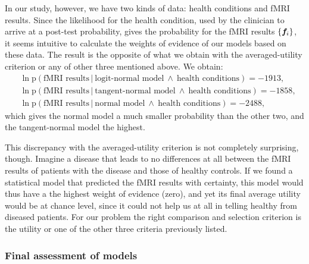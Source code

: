 \documentclass[%
]{frontiersSCNS-nologo} %
\newcommand*{\pf}{\mathrm{p}}%
\renewcommand*{\|}{\mathpunct{|}}%
\newcommand*{\Land}{\mathbin{\ \land\ }}
\newcommand*{\Cond}{\mathpunct{\,|\ }}%
\DeclarePairedDelimiter\set{\{}{\}}%
\newcommand*{\yxx}{f}
\newcommand*{\yx}{\bm{\yxx}}
\begin{document}
In our study, however, we have two kinds of data: health conditions and
fMRI results. Since the likelihood for the health condition, used by the
clinician to arrive at a post-test probability, gives the probability for
the fMRI results $\set{\yx_i}$, it seems intuitive to calculate the weights
of evidence of our models based on these data. The result is the opposite
of what we obtain with the averaged-utility criterion or any of other three
mentioned above. We obtain:
\begin{equation}
  \label{eq:weights_evidence}
  \begin{aligned}
    &\ln\pf(\text{fMRI results} \Cond \text{logit-normal model} \Land \text{health conditions}) = -1913,\\
    &\ln\pf(\text{fMRI results} \Cond \text{tangent-normal model} \Land \text{health conditions}) = -1858,\\
    &\ln\pf(\text{fMRI results} \Cond \text{normal model} \Land \text{health conditions}) = -2488,
  \end{aligned}
\end{equation}
which gives the normal model a much smaller probability than the other two,
and the tangent-normal model the highest.


This discrepancy with the averaged-utility criterion is not completely
surprising, though. Imagine a disease that leads to no differences at all
between the fMRI results of patients with the disease and those of healthy
controls. If we found a statistical model that predicted the fMRI results with
certainty, this model would thus have a the highest weight of evidence
(zero), and yet its final average utility would be at chance level, since
it could not help us at all in telling healthy from diseased patients. For
our problem the right comparison and selection criterion is the utility or
one of the other three criteria previously listed.



\subsubsection{Final assessment of models}
\label{sec:assessment}
\end{document}
